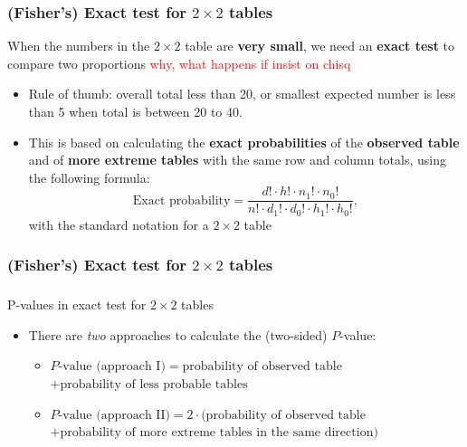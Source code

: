 \documentclass[compress, notes=hide]{beamer}
\newcommand{\hl}[1]{\textbf{#1}}
\begin{document}

\begin{frame}
	\frametitle{(Fisher's) Exact test for $2 \times 2$ tables}
	\begin{block}{}
		When the numbers in the $2 \times 2$ table are\textbf{ very small}, we
		need an \hl{exact test} to compare two proportions \textcolor{red}{why, what happens if insist on chisq}
		
		\begin{itemize}
			\item  Rule of thumb: overall total less than 20, or smallest expected number is less than 5 when total is between 20 to 40.
			\item This is based on calculating the \hl{exact probabilities} of
			the \textbf{observed table} and of \textbf{more extreme tables }with the same row and
			column totals, using the following formula:
			\begin{equation}
				\text{Exact probability} = \frac{d! \cdot h! \cdot n_1! \cdot n_0!}{n! \cdot d_1! \cdot d_0! \cdot h_1! \cdot h_0!},\nonumber
			\end{equation}
			with the standard notation for a $2 \times 2$ table
		\end{itemize}
	\end{block}
\end{frame}



\begin{frame}
	\frametitle{(Fisher's) Exact test for $2 \times 2$ tables}
	\frametitle{}
	\begin{block}{P-values in exact test for $2 \times 2$ tables}
		\begin{itemize}
			\item There are \emph{two} approaches to calculate the (two-sided) $P$-value:
			\begin{itemize}
				\vspace*{1em}   
				\item $\text{$P$-value (approach $\mathrm{I}$)} = \text{probability of
					observed table}$ $ + \text{probability of less probable tables}$
				
				\vspace*{1em}    
				\item $\text{$P$-value (approach $\mathrm{II}$)} = 2 \cdot
				(\text{probability of observed table} $ $ + \text{probability of more extreme tables in the same direction)}$
			\end{itemize}
		\end{itemize}
	\end{block}
\end{frame}
\end{document}
